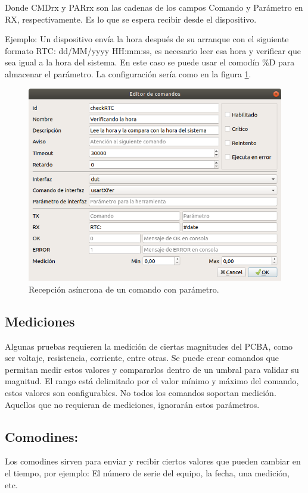 \documentclass[a4paper,12pt]{refart}
\begin{document}
Donde CMDrx y PARrx son las cadenas de los campos Comando y Parámetro en RX, respectivamente. Es lo que se espera recibir desde el dispositivo.

Ejemplo: Un dispositivo envía la hora después de su arranque con el siguiente formato RTC: dd/MM/yyyy HH:mm:ss, es necesario leer esa hora y verificar que sea igual a la hora del sistema. En este caso se puede usar el comodín \%D para almacenar el parámetro. La configuración sería como en la figura \ref{fig:commands6}.

\begin{figure}[H]\centering
\includegraphics[scale=0.4, frame]{images/commands6} 
\caption{Recepción asíncrona de un comando con parámetro.}
\label{fig:commands6}
\end{figure}

\subsection{Mediciones}
Algunas pruebas requieren la medición de ciertas magnitudes del PCBA, como ser voltaje, resistencia, corriente, entre otras. Se puede crear comandos que permitan medir estos valores y compararlos dentro de un umbral para validar su magnitud. El rango está delimitado por el valor mínimo y máximo del comando, estos valores son configurables. No todos los comandos soportan medición. Aquellos que no requieran de mediciones, ignorarán estos parámetros.

\subsection{Comodines:}
Los comodines sirven para enviar y recibir ciertos valores que pueden cambiar en el tiempo, por ejemplo: El número de serie del equipo, la fecha, una medición, etc.
\end{document}
